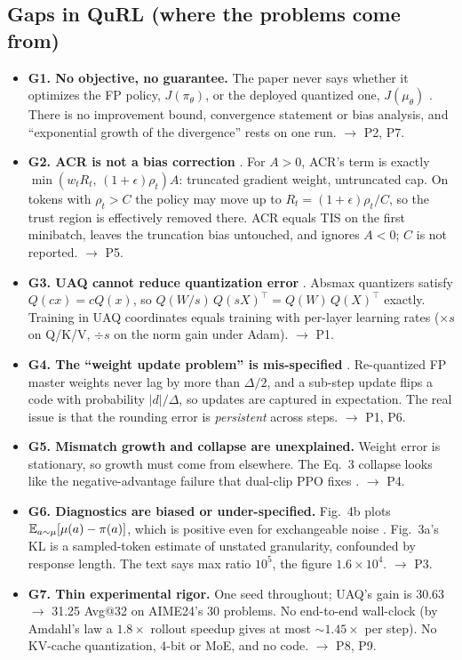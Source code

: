 \documentclass[11pt]{article}
\begin{document}
\subsection{Gaps in QuRL (where the problems come from)}\label{sec:gaps}
\begin{itemize}
\item \textbf{G1. No objective, no guarantee.} The paper never says whether it optimizes the FP policy, $J(\pi_\theta)$, or the deployed quantized one, $J(\mu_\theta)$ \citep[cf.][]{liang2026mirage}. There is no improvement bound, convergence statement or bias analysis, and ``exponential growth of the divergence'' rests on one run. $\to$ P2, P7.
\item \textbf{G2. ACR is not a bias correction} \tagderived. For $A>0$, ACR's term is exactly $\min(w_tR_t,\,(1+\epsilon)\rho_t)A$: truncated gradient weight, untruncated cap. On tokens with $\rho_t>C$ the policy may move up to $R_t=(1+\epsilon)\rho_t/C$, so the trust region is effectively removed there. ACR equals TIS on the first minibatch, leaves the truncation bias untouched, and ignores $A<0$; $C$ is not reported. $\to$ P5.
\item \textbf{G3. UAQ cannot reduce quantization error} \tagchecked. Absmax quantizers satisfy $Q(cx)=cQ(x)$, so $Q(W/s)\,Q(sX)^\top=Q(W)\,Q(X)^\top$ exactly. Training in UAQ coordinates equals training with per-layer learning rates ($\times s$ on Q/K/V, $\div s$ on the norm gain under Adam). $\to$ P1.
\item \textbf{G4. The ``weight update problem'' is mis-specified} \tagchecked. Re-quantized FP master weights never lag by more than $\Delta/2$, and a sub-step update flips a code with probability $|d|/\Delta$, so updates are captured in expectation. The real issue is that the rounding error is \emph{persistent} across steps. $\to$ P1, P6.
\item \textbf{G5. Mismatch growth and collapse are unexplained.} Weight error is stationary, so growth must come from elsewhere. The Eq.~3 collapse looks like the negative-advantage failure that dual-clip PPO \citep{ye2020dualclip} fixes \tagconj. $\to$ P4.
\item \textbf{G6. Diagnostics are biased or under-specified.} Fig.~4b plots $\mathbb{E}_{a\sim\mu}[\mu(a)-\pi(a)]$, which is positive even for exchangeable noise \tagchecked. Fig.~3a's KL is a sampled-token estimate of unstated granularity, confounded by response length. The text says max ratio $10^5$, the figure $1.6\times10^4$. $\to$ P3.
\item \textbf{G7. Thin experimental rigor.} One seed throughout; UAQ's gain is 30.63 $\to$ 31.25 Avg@32 on AIME24's 30 problems. No end-to-end wall-clock (by Amdahl's law a $1.8\times$ rollout speedup gives at most ${\sim}1.45\times$ per step). No KV-cache quantization, 4-bit or MoE, and no code. $\to$ P8, P9.
\end{itemize}
\end{document}
